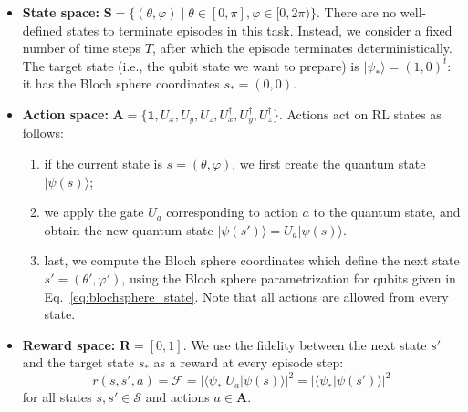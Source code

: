 \begin{itemize}

    \item \textbf{State space:} $\mathbf{S} = \{(\theta,\varphi)\;|\;\theta\in[0,\pi],\varphi\in[0,2\pi)\}$. There are no well-defined states to terminate episodes in this task. Instead, we consider a fixed number of time steps $T$, after which the episode terminates deterministically. The target state (i.e., the qubit state we want to prepare) is $|\psi_\ast\rangle=(1,0)^t$: it has the Bloch sphere coordinates $s_\ast=(0,0)$. 

    \item \textbf{Action space:} $\mathbf{A} = \{\boldsymbol{1},U_x,U_y,U_z,U_x^\dagger,U_y^\dagger,U_z^\dagger\}$. Actions  act on RL states as follows: 
    \begin{enumerate}
        \item if the current state is $s=(\theta,\varphi)$, we first create the quantum state $|\psi(s)\rangle$; 
        \item we apply the gate $U_a$ corresponding to action $a$ to the quantum state, and obtain the new quantum state $|\psi(s')\rangle = U_a|\psi(s)\rangle$. 
        \item last, we compute the Bloch sphere coordinates which define the next state $s'=(\theta',\varphi')$, using the Bloch sphere parametrization for qubits given in Eq.~\eqref{eq:blochsphere_state}.
    Note that all actions are allowed from every state. 
    \end{enumerate}

    \item \textbf{Reward space:} $\mathbf{R}=[0,1]$. We use the fidelity between the next state $s'$ and the target state $s_\ast$ as a reward at every episode step: 
    \begin{equation}
        r(s,s',a)= \mathcal F = |\langle\psi_\ast|U_a|\psi(s)\rangle|^2=|\langle\psi_\ast|\psi(s')\rangle|^2
    \end{equation}
    for all states $s,s'\in\mathcal{S}$ and actions $a\in\mathbf{A}$. 
\end{itemize}


